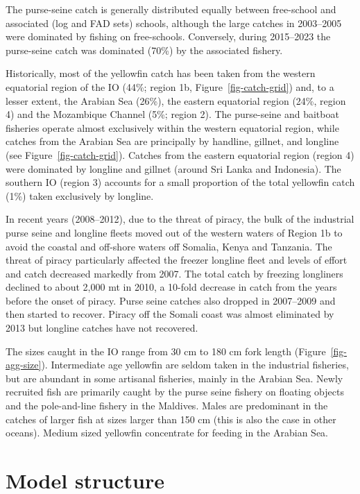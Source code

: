 \documentclass[
]{scrartcl}
\begin{document}
The purse-seine catch is generally distributed equally between
free-school and associated (log and FAD sets) schools, although the
large catches in 2003--2005 were dominated by fishing on free-schools.
Conversely, during 2015--2023 the purse-seine catch was dominated (70\%)
by the associated fishery.

Historically, most of the yellowfin catch has been taken from the
western equatorial region of the IO (44\%; region 1b,
Figure~\ref{fig-catch-grid}) and, to a lesser extent, the Arabian Sea
(26\%), the eastern equatorial region (24\%, region 4) and the
Mozambique Channel (5\%; region 2). The purse-seine and baitboat
fisheries operate almost exclusively within the western equatorial
region, while catches from the Arabian Sea are principally by handline,
gillnet, and longline (see Figure~\ref{fig-catch-grid}). Catches from
the eastern equatorial region (region 4) were dominated by longline and
gillnet (around Sri Lanka and Indonesia). The southern IO (region 3)
accounts for a small proportion of the total yellowfin catch (1\%) taken
exclusively by longline.

In recent years (2008--2012), due to the threat of piracy, the bulk of
the industrial purse seine and longline fleets moved out of the western
waters of Region 1b to avoid the coastal and off-shore waters off
Somalia, Kenya and Tanzania. The threat of piracy particularly affected
the freezer longline fleet and levels of effort and catch decreased
markedly from 2007. The total catch by freezing longliners declined to
about 2,000 mt in 2010, a 10-fold decrease in catch from the years
before the onset of piracy. Purse seine catches also dropped in
2007--2009 and then started to recover. Piracy off the Somali coast was
almost eliminated by 2013 but longline catches have not recovered.

The sizes caught in the IO range from 30 cm to 180 cm fork length
(Figure~\ref{fig-agg-size}). Intermediate age yellowfin are seldom taken
in the industrial fisheries, but are abundant in some artisanal
fisheries, mainly in the Arabian Sea. Newly recruited fish are primarily
caught by the purse seine fishery on floating objects and the
pole-and-line fishery in the Maldives. Males are predominant in the
catches of larger fish at sizes larger than 150 cm (this is also the
case in other oceans). Medium sized yellowfin concentrate for feeding in
the Arabian Sea.

\section{Model structure}\label{model-structure}
\end{document}
